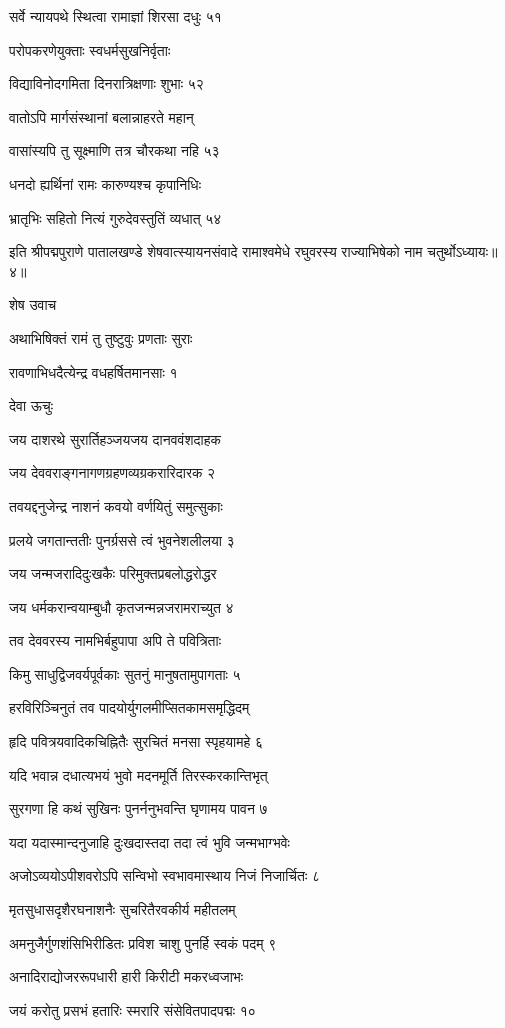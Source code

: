 सर्वे न्यायपथे स्थित्वा रामाज्ञां शिरसा दधुः ५१

परोपकरणेयुक्ताः स्वधर्मसुखनिर्वृताः

विद्याविनोदगमिता दिनरात्रिक्षणाः शुभाः ५२

वातोऽपि मार्गसंस्थानां बलान्नाहरते महान्

वासांस्यपि तु सूक्ष्माणि तत्र चौरकथा नहि ५३

धनदो ह्यर्थिनां रामः कारुण्यश्च कृपानिधिः

भ्रातृभिः सहितो नित्यं गुरुदेवस्तुतिं व्यधात् ५४

इति श्रीपद्मपुराणे पातालखण्डे शेषवात्स्यायनसंवादे रामाश्वमेधे रघुवरस्य राज्याभिषेको नाम चतुर्थोऽध्यायः॥४॥


शेष उवाच

अथाभिषिक्तं रामं तु तुष्टुवुः प्रणताः सुराः

रावणाभिधदैत्येन्द्र वधहर्षितमानसाः १

देवा ऊचुः

जय दाशरथे सुरार्तिहञ्जयजय दानववंशदाहक

जय देववराङ्गनागणग्रहणव्यग्रकरारिदारक २

तवयद्दनुजेन्द्र नाशनं कवयो वर्णयितुं समुत्सुकाः

प्रलये जगतान्ततीः पुनर्ग्रससे त्वं भुवनेशलीलया ३

जय जन्मजरादिदुःखकैः परिमुक्तप्रबलोद्धरोद्धर

जय धर्मकरान्वयाम्बुधौ कृतजन्मन्नजरामराच्युत ४

तव देववरस्य नामभिर्बहुपापा अपि ते पवित्रिताः

किमु साधुद्विजवर्यपूर्वकाः सुतनुं मानुषतामुपागताः ५

हरविरिञ्चिनुतं तव पादयोर्युगलमीप्सितकामसमृद्धिदम्

हृदि पवित्रयवादिकचिह्नितैः सुरचितं मनसा स्पृहयामहे ६

यदि भवान्न दधात्यभयं भुवो मदनमूर्ति तिरस्करकान्तिभृत्

सुरगणा हि कथं सुखिनः पुनर्ननुभवन्ति घृणामय पावन ७

यदा यदास्मान्दनुजाहि दुःखदास्तदा तदा त्वं भुवि जन्मभाग्भवेः

अजोऽव्ययोऽपीशवरोऽपि सन्विभो स्वभावमास्थाय निजं निजार्चितः ८

मृतसुधासदृशैरघनाशनैः सुचरितैरवकीर्य महीतलम्

अमनुजैर्गुणशंसिभिरीडितः प्रविश चाशु पुनर्हि स्वकं पदम् ९

अनादिराद्योजररूपधारी हारी किरीटी मकरध्वजाभः

जयं करोतु प्रसभं हतारिः स्मरारि संसेवितपादपद्मः १०

